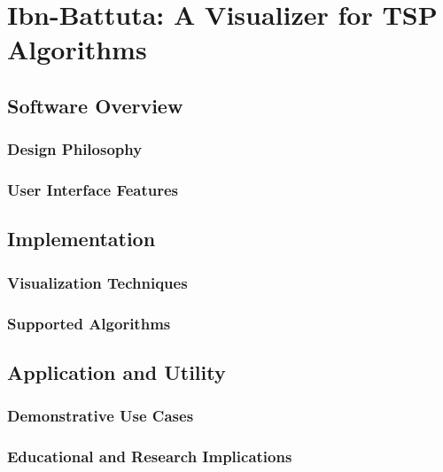 \chapter{Ibn-Battuta: A Visualizer for TSP Algorithms}\label{chapt:7}

\section{Software Overview}

\subsection{Design Philosophy}

\subsection{User Interface Features}

\section{Implementation}

\subsection{Visualization Techniques}

\subsection{Supported Algorithms}

\section{Application and Utility}

\subsection{Demonstrative Use Cases}

\subsection{Educational and Research Implications}
